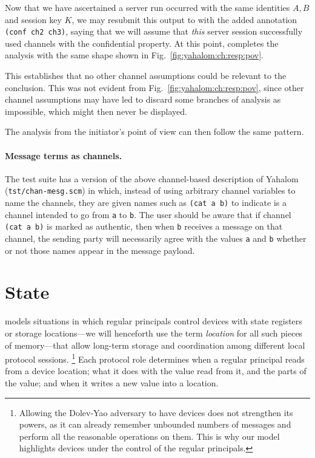 Now that we have ascertained a server run occurred with the same
identities $A,B$ and session key $K$, we may resubmit this output to
{\cpsa} with the added annotation \texttt{(conf ch2 ch3)}, saying that
we will assume that \emph{this} server session successfully used
channels with the confidential property.  At this point, {\cpsa}
completes the analysis with the same shape shown in
Fig.~\ref{fig:yahalom:ch:resp:pov}.

This establishes that no other channel assumptions could be relevant
to the conclusion.  This was not evident from
Fig.~\ref{fig:yahalom:ch:resp:pov}, since other channel assumptions
may have led {\cpsa} to discard some branches of analysis as
impossible, which might then never be displayed.

The analysis from the initiator's point of view can then follow the
same pattern.

\paragraph{Message terms as channels.} The test suite has a version of
the above channel-based description of Yahalom
(\texttt{tst/chan-mesg.scm}) in which, instead of using arbitrary
channel variables to name the channels, they are given names such as
\verb|(cat a b)| to indicate is a channel intended to go from \verb|a|
to \verb|b|. The user should be aware that if channel \verb|(cat a b)|
is marked as authentic, then when \verb|b| receives a message on that
channel, the sending party will necessarily agree with the values
\verb|a| and \verb|b| whether or not those names appear in the message
payload.

\section{State}
\label{sec:channels:state:state}

{\cpsa} models situations in which regular principals control devices
with state registers or storage locations---we will henceforth use the
term \emph{location} for all such pieces of memory---that allow
long-term storage and coordination among different local protocol
sessions.%
%
\footnote{Allowing the Dolev-Yao adversary to have devices does not
  strengthen its powers, as it can already remember unbounded numbers
  of messages and perform all the reasonable operations on them.  This
  is why our model highlights devices under the control of the regular
  principals.}
%
Each protocol role determines when a regular principal reads from a
device location; what it does with the value read from it, and the
parts of the value; and when it writes a new value into a location.

